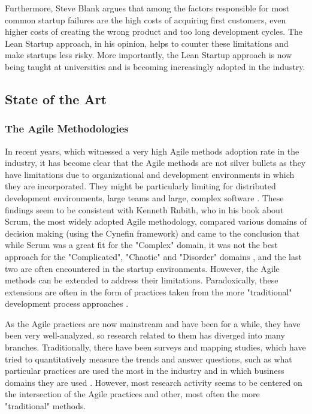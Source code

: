 \documentclass{article}
\begin{document}
Furthermore, Steve Blank argues that among the factors responsible for most common startup failures are the high costs of acquiring first customers, even higher costs of creating the wrong product and too long development cycles. The Lean Startup approach, in his opinion, helps to counter these limitations and make startups less risky. More importantly, the Lean Startup approach is now being taught at universities and is becoming increasingly adopted in the industry.

\subsection{State of the Art}
\subsubsection{The Agile Methodologies}
In recent years, which witnessed a very high Agile methods adoption rate in the industry, it has become clear that the Agile methods are not silver bullets as they have limitations due to organizational and development environments in which they are incorporated. They might be particularly limiting for distributed development environments, large teams and large, complex software \citep{turk2014assumptions}. These findings seem to be consistent with Kenneth Rubith, who in his book about Scrum, the most widely adopted Agile methodology, compared various domains of decision making (using the Cynefin framework) and came to the conclusion that while Scrum was a great fit for the "Complex" domain, it was not the best approach for the "Complicated", "Chaotic" and "Disorder" domains \citep{rubin2012essential}, and the last two are often encountered in the startup environments. However, the Agile methods can be extended to address their limitations. Paradoxically, these extensions are often in the form of practices taken from the more "traditional" development process approaches \citep{turk2014limitations}.

As the Agile practices are now mainstream and have been for a while, they have been very well-analyzed, so research related to them has diverged into many branches. Traditionally, there have been surveys and mapping studies, which have tried to quantitatively measure the trends and answer questions, such as what particular practices are used the most in the industry and in which business domains they are used \citep{diebold2014Agile}. However, most research activity seems to be centered on the intersection of the Agile practices and other, most often the more "traditional" methods.
\end{document}
